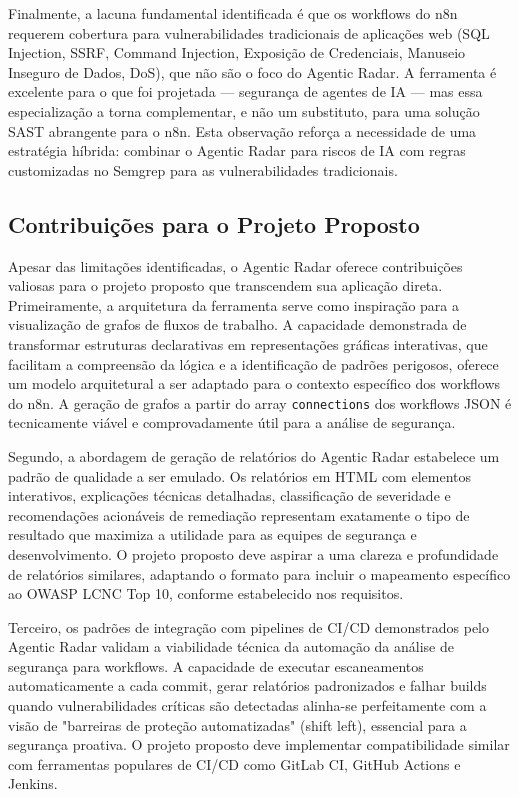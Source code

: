 \documentclass{sftex}
\begin{document}
Finalmente, a lacuna fundamental identificada é que os workflows do n8n requerem cobertura para vulnerabilidades tradicionais de aplicações web (SQL Injection, SSRF, Command Injection, Exposição de Credenciais, Manuseio Inseguro de Dados, DoS), que não são o foco do Agentic Radar. A ferramenta é excelente para o que foi projetada — segurança de agentes de IA — mas essa especialização a torna complementar, e não um substituto, para uma solução SAST abrangente para o n8n. Esta observação reforça a necessidade de uma estratégia híbrida: combinar o Agentic Radar para riscos de IA com regras customizadas no Semgrep para as vulnerabilidades tradicionais.

\subsection{Contribuições para o Projeto Proposto}

Apesar das limitações identificadas, o Agentic Radar oferece contribuições valiosas para o projeto proposto que transcendem sua aplicação direta. Primeiramente, a arquitetura da ferramenta serve como inspiração para a visualização de grafos de fluxos de trabalho. A capacidade demonstrada de transformar estruturas declarativas em representações gráficas interativas, que facilitam a compreensão da lógica e a identificação de padrões perigosos, oferece um modelo arquitetural a ser adaptado para o contexto específico dos workflows do n8n. A geração de grafos a partir do array \texttt{connections} dos workflows JSON é tecnicamente viável e comprovadamente útil para a análise de segurança.

Segundo, a abordagem de geração de relatórios do Agentic Radar estabelece um padrão de qualidade a ser emulado. Os relatórios em HTML com elementos interativos, explicações técnicas detalhadas, classificação de severidade e recomendações acionáveis de remediação representam exatamente o tipo de resultado que maximiza a utilidade para as equipes de segurança e desenvolvimento. O projeto proposto deve aspirar a uma clareza e profundidade de relatórios similares, adaptando o formato para incluir o mapeamento específico ao OWASP LCNC Top 10, conforme estabelecido nos requisitos.

Terceiro, os padrões de integração com pipelines de CI/CD demonstrados pelo Agentic Radar validam a viabilidade técnica da automação da análise de segurança para workflows. A capacidade de executar escaneamentos automaticamente a cada commit, gerar relatórios padronizados e falhar builds quando vulnerabilidades críticas são detectadas alinha-se perfeitamente com a visão de "barreiras de proteção automatizadas" (shift left), essencial para a segurança proativa. O projeto proposto deve implementar compatibilidade similar com ferramentas populares de CI/CD como GitLab CI, GitHub Actions e Jenkins.
\end{document}
